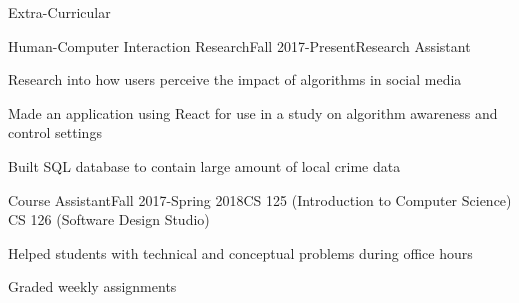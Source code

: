\documentclass{resume} %
\begin{document}
    \begin{rSection}{Extra-Curricular} \itemsep -3pt
            \begin{rSubsection}{Human-Computer Interaction Research}{Fall 2017-Present}{Research Assistant}{}{}
            \item Research into how users perceive the impact of algorithms in social media
            \item Made an application using React for use in a study on algorithm awareness and control settings
            \item Built SQL database to contain large amount of local crime data
            \end{rSubsection}

            \begin{rSubsection}{Course Assistant}{Fall 2017-Spring 2018}{CS 125 (Introduction to Computer Science) \\ CS 126 (Software Design Studio)}{}{}
            \item Helped students with technical and conceptual problems during office hours
            \item Graded weekly assignments
            \end{rSubsection}

    \end{rSection}

    
\end{document}
